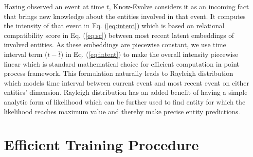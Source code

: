 \documentclass{article}
\begin{document}
Having observed an event at time $t$, Know-Evolve considers it as an incoming fact that brings new knowledge about the entities involved in that event. It computes the intensity of that event in Eq. (\ref{eq:intent}) which is based on relational compatibility score in Eq. (\ref{eq:sc}) between most recent latent embeddings of involved entities. As these embeddings are piecewise constant, we use time interval term ($t - \bar{t}$) in Eq. (\ref{eq:intent}) to make the overall intensity piecewise linear which is standard mathematical choice for efficient computation in point process framework. This formulation naturally leads to Rayleigh distribution which models time interval between current event and most recent event on either entities' dimension. Rayleigh distribution has an added benefit of having a simple analytic form of likelihood which can be further used to find entity for which the likelihood reaches maximum value and thereby make precise entity predictions. 

\vspace{-0.3cm}
\section{Efficient Training Procedure}
\end{document}
